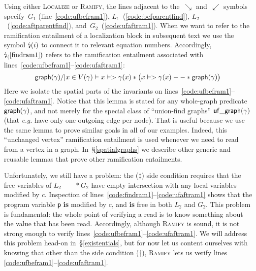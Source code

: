 Using either \textsc{Localize} or \textsc{Ramify}, the lines adjacent to the~$\searrow$ and~$\swarrow$ symbols specify~$G_1$ (line~\ref{code:ufbefram1}), $L_1$~(\ref{code:befparentfind}),
$L_2$~(\ref{code:aftparentfind}), and~$G_2$~(\ref{code:ufaftram1}). 
When we want to refer to the ramification entailment of a localization block in subsequent text we use the symbol $\mbox{\lightning}(i)$ to connect it to relevant equation numbers.  Accordingly, $\mbox{\lightning}_(\ref{findram1})$ refers to the ramification entailment associated with lines~\ref{code:ufbefram1}--\ref{code:ufaftram1}:
\begin{equation}
\label{findram1}
\mathsf{graph}(\gamma) /| x \in V(\gamma) |- x |-> \gamma(x) * \big(x |-> \gamma(x) --* \mathsf{graph}(\gamma)\big)
\end{equation}
Here we isolate the spatial parts of the invariants on lines~\ref{code:ufbefram1}--\ref{code:ufaftram1}.  Notice that this lemma is stated for any whole-graph predicate $\mathsf{graph}(\gamma)$, and not merely for the special class of ``union-find graphs'' $\mathsf{uf\_graph}(\gamma)$ (that \emph{e.g.} have only one outgoing edge per node).  That is useful because we use the same lemma to prove similar goals in all of our examples.
Indeed, this ``unchanged vertex'' ramification entailment is used whenever we need to read from a vertex in a graph.  In~\S\ref{spatialgraphs} we describe other generic and reusable lemmas that prove other ramification entailments.

Unfortunately, we still have a problem: the ($\ddagger$) side condition requires that the free variables of $L_2 --* G_2$ have empty intersection with any local variables modified by $c$.  Inspection of lines~\ref{code:findram1}--\ref{code:ufaftram1} shows that the program variable \texttt{p} \textbf{is} modified by $c$, and \textbf{is} free in both $L_2$ and $G_2$.  This problem is fundamental: the whole point of verifying a read is to know something about the value that has been read.  Accordingly, although \textsc{Ramify} is sound, it is not strong enough to verify
lines~\ref{code:ufbefram1}--\ref{code:ufaftram1}.  We will address this problem head-on in~\S\ref{existentials}, but for now let us content ourselves with knowing that other than the side condition ($\ddagger$), \textsc{Ramify} lets us verify lines \ref{code:ufbefram1}--\ref{code:ufaftram1}.

